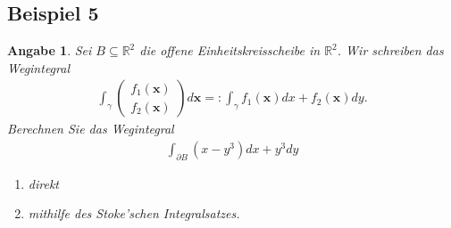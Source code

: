 \documentclass[]{article}
\newtheorem*{angabe*}{Angabe}
\begin{document}
\subsection*{Beispiel 5}
\begin{angabe*}
	Sei $B \subseteq \mathbb{R}^2$ die offene Einheitskreisscheibe in $\mathbb{R}^2$. Wir schreiben das Wegintegral
	\begin{align*}
		\int_\gamma \begin{pmatrix}	f_1(\bm{x})\\ f_2(\bm{x}) \end{pmatrix} d\bm{x} =: \int_\gamma f_1(\bm{x}) dx + f_2(\bm{x}) dy.
	\end{align*}
	Berechnen Sie das Wegintegral
	\begin{align*}
		\int_{\partial B} (x-y^3) dx + y^3 dy
	\end{align*}
	\begin{enumerate}[label*=(\roman*)]
		\item direkt
		\item mithilfe des Stoke'schen Integralsatzes.
	\end{enumerate}
\end{angabe*}
\end{document}
